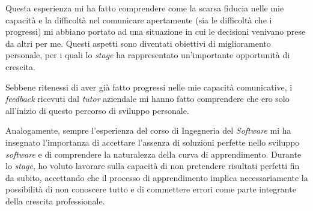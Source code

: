        \vspace{0.2 em}
        \noindent Questa esperienza mi ha fatto comprendere come la scarsa fiducia nelle mie capacità e la difficoltà nel comunicare apertamente (sia le difficoltà che i progressi) mi abbiano portato ad una situazione in cui le decisioni venivano prese da altri per me. Questi aspetti sono diventati obiettivi di miglioramento personale, per i quali lo \textit{stage} ha rappresentato un'importante opportunità di crescita.

        \vspace{0.2 em}
        \noindent Sebbene ritenessi di aver già fatto progressi nelle mie capacità comunicative, i \textit{feedback} ricevuti dal \textit{tutor} aziendale mi hanno fatto comprendere che ero solo all'inizio di questo percorso di sviluppo personale.

        \vspace{0.2 em}
        \noindent Analogamente, sempre l'esperienza del corso di Ingegneria del \textit{Software} mi ha insegnato l'importanza di accettare l'assenza di soluzioni perfette nello sviluppo \textit{software} e di comprendere la naturalezza della curva di apprendimento. Durante lo \textit{stage}, ho voluto lavorare sulla capacità di non pretendere risultati perfetti fin da subito, accettando che il processo di apprendimento implica necessariamente la possibilità di non conoscere tutto e di commettere errori come parte integrante della crescita professionale.

